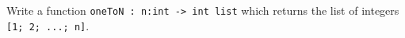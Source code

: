 Write a function \lstinline{oneToN : n:int -> int list} which returns the list of integers \lstinline{[1; 2; ...; n]}.
